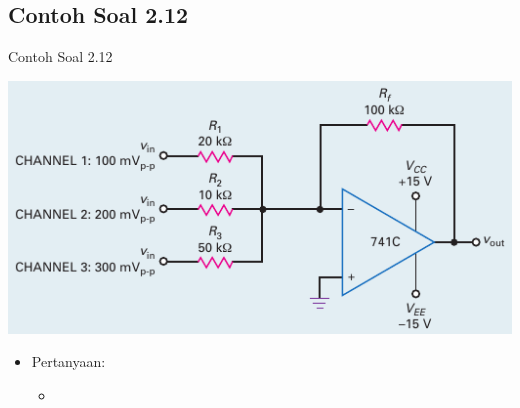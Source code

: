 \subsection{Contoh Soal 2.12}
\begin{frame}{Contoh Soal 2.12}
	\begin{multicols}{2}
		\begin{center}
			\includegraphics[width=\linewidth]{gambar/fig-16.25}
		\end{center}
		\columnbreak
		\begin{itemize}
			\item Pertanyaan:
			\begin{itemize}
				\item 
			\end{itemize}
		\end{itemize}
	\end{multicols}
\end{frame}